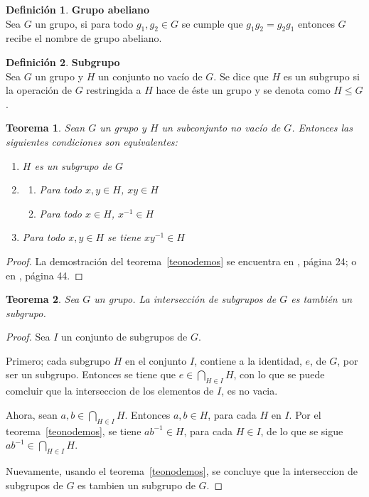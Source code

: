 \documentclass[12pt]{book}
\newtheorem{theorem}{Teorema}
\theoremstyle{definition}
\newtheorem{definition}{Definición}
\begin{document}
\begin{definition}\textbf{Grupo abeliano}\\
  Sea $G$ un grupo, si para todo $g_1,g_2\in G$ se cumple que
  $g_1g_2=g_2g_1$ entonces $G$ recibe el nombre de grupo abeliano.
\end{definition}


\begin{definition}\textbf{Subgrupo}\\
  Sea $G$ un grupo y $H$ un conjunto no vacío de $G$. Se dice que $H$
  es un subgrupo si la operación de $G$ restringida a $H$ hace de
  \'este un grupo y se denota como $H\le G$.
\end{definition}


\begin{theorem}\label{subgrupo}
  Sean $G$ un grupo y $H$ un subconjunto no vacío de $G$. Entonces las
  siguientes condiciones son equivalentes:
  \begin{enumerate}
  \item $H$ es un subgrupo de $G$
  \item \begin{enumerate}
    \item Para todo $x,y \in H$, $xy\in H$
    \item Para todo $x\in H$, $x^{-1}\in H$
    \end{enumerate}
  \item Para todo $x,y \in H$ se tiene $xy^{-1}\in H$
  \end{enumerate}\label{teonodemos}
\end{theorem}

\begin{proof}
  La demostración del teorema~\ref{teonodemos} se encuentra en
  \cite{Barrera}, página 24; o en \cite{Ehrlich}, página 44.
\end{proof}

\begin{theorem}
Sea $G$ un grupo. La intersección de subgrupos de $G$ es también un subgrupo. 
\end{theorem}

\begin{proof}
Sea $I$ un conjunto de subgrupos de $G$. 

Primero; cada subgrupo $H$ en el conjunto $I$, contiene a la identidad,
$e$, de $G$, por ser un subgrupo. Entonces se tiene que
$e\in \bigcap_{H\in I}H$, con lo que se puede comcluir que la
interseccion de los elementos de $I$, es no vacia.

Ahora, sean $a,b\in \bigcap_{H\in I}H$. Entonces $a,b\in H$,
para cada $H$ en $I$. Por el teorema~\ref{teonodemos}, se tiene
$ab^{-1}\in H$, para cada $H\in I$, de lo que se sigue $ab^{-1}\in
\bigcap_{H\in I}H$.

Nuevamente, usando el teorema~\ref{teonodemos}, se concluye que la
interseccion de subgrupos de $G$ es tambien un subgrupo de $G$.
\end{proof}
\end{document}
